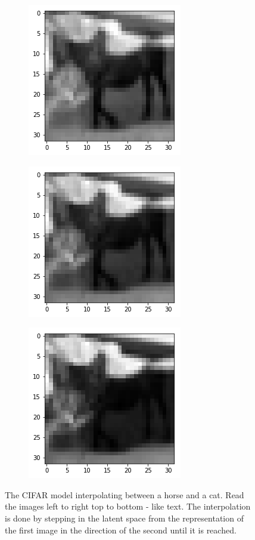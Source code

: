 \begin{figure}[H]
\begin{subfigure}{.3\linewidth}
\end{subfigure}
\begin{subfigure}{.3\linewidth}
 \centering
 \includegraphics[scale=0.4]{chapter_3_figures/interp8.png}
\end{subfigure}
 \hfill
\begin{subfigure}{.3\linewidth}
 \centering
 \includegraphics[scale=0.4]{chapter_3_figures/interp9.png}
\end{subfigure}
 \hfill
\begin{subfigure}{.3\linewidth}
 \centering
 \includegraphics[scale=0.4]{chapter_3_figures/interp10.png}
\end{subfigure}
\caption{The CIFAR model interpolating between a horse and a cat. Read the images left to right top to bottom - like text. The interpolation is done by stepping in the latent space from the representation of the first image in the direction of the second until it is reached.}
\end{figure}

